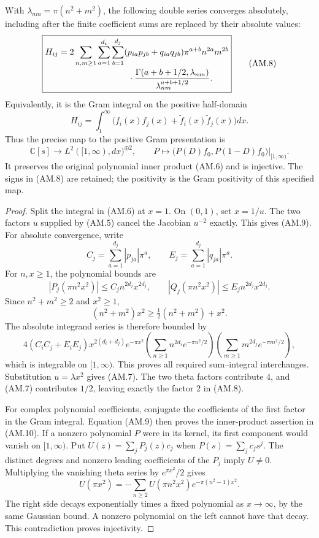 \begin{theorem}
With \(\lambda_{nm}=\pi(n^2+m^2)\), the following double series
converges absolutely, including after the finite coefficient sums
are replaced by their absolute values:
\[
 \boxed{\begin{aligned}
 H_{ij}={}&2\sum_{n,m\geq1}\sum_{a=1}^{d_i}\sum_{b=1}^{d_j}
 (p_{ia}p_{jb}+q_{ia}q_{jb})\pi^{a+b}n^{2a}m^{2b}\\[-2pt]
 &\hspace{24mm}\cdot
 \frac{\Gamma(a+b+1/2,\lambda_{nm})}
      {\lambda_{nm}^{a+b+1/2}}.
 \end{aligned}}
 \tag{AM.8}
\]
Equivalently, it is the Gram integral on the positive half-domain
\[
 H_{ij}=\int_1^\infty
       \bigl(f_i(x)f_j(x)+\widetilde f_i(x)\widetilde f_j(x)\bigr)dx.
 \tag{AM.9}
\]
Thus the precise map to the positive Gram presentation is
\[
 \mathbb C[s]\longrightarrow L^2([1,\infty),dx)^{\oplus2},
 \qquad P\longmapsto\bigl(P(D)f_0,P(1-D)f_0\bigr)\big|_{[1,\infty)}.
 \tag{AM.10}
\]
It preserves the original polynomial inner product (AM.6) and is
injective.  The signs in (AM.8) are retained; the positivity is
the Gram positivity of this specified map.
\end{theorem}

\begin{proof}
Split the integral in (AM.6) at \(x=1\).  On \((0,1)\), set
\(x=1/u\).  The two factors \(u\) supplied by (AM.5) cancel the
Jacobian \(u^{-2}\) exactly.  This gives (AM.9).
For absolute convergence, write
\[
 C_j=\sum_{a=1}^{d_j}|p_{ja}|\pi^a,\qquad
 E_j=\sum_{a=1}^{d_j}|q_{ja}|\pi^a.
 \tag{AM.11}
\]
For \(n,x\geq1\), the polynomial bounds are
\[
 |P_j(\pi n^2x^2)|\leq C_j n^{2d_j}x^{2d_j},\qquad
 |Q_j(\pi n^2x^2)|\leq E_j n^{2d_j}x^{2d_j}.
\]
Since \(n^2+m^2\geq2\) and \(x^2\geq1\),
\[
 (n^2+m^2)x^2\geq\tfrac12(n^2+m^2)+x^2.
\]
The absolute integrand series is therefore bounded by
\[
 4(C_iC_j+E_iE_j)x^{2(d_i+d_j)}e^{-\pi x^2}
 \left(\sum_{n\geq1}n^{2d_i}e^{-\pi n^2/2}\right)
 \left(\sum_{m\geq1}m^{2d_j}e^{-\pi m^2/2}\right),
\]
which is integrable on \([1,\infty)\).  This proves all required
sum--integral interchanges.  Substitution \(u=\lambda x^2\)
gives (AM.7).  The two theta factors contribute \(4\), and
(AM.7) contributes \(1/2\), leaving exactly the factor \(2\)
in (AM.8).

For complex polynomial coefficients, conjugate the coefficients
of the first factor in the Gram integral.  Equation (AM.9) then
proves the inner-product assertion in (AM.10).  If a nonzero
polynomial \(P\) were in its kernel, its first component would
vanish on \([1,\infty)\).  Put \(U(z)=\sum_jP_j(z)c_j\) when
\(P(s)=\sum_jc_js^j\).  The distinct degrees and nonzero leading
coefficients of the \(P_j\) imply \(U\ne0\).  Multiplying the
vanishing theta series by \(e^{\pi x^2}/2\) gives
\[
 U(\pi x^2)=-\sum_{n\geq2}U(\pi n^2x^2)
                         e^{-\pi(n^2-1)x^2}.
\]
The right side decays exponentially times a fixed polynomial as
\(x\to\infty\), by the same Gaussian bound.  A nonzero polynomial
on the left cannot have that decay.  This contradiction proves
injectivity.
\end{proof}

